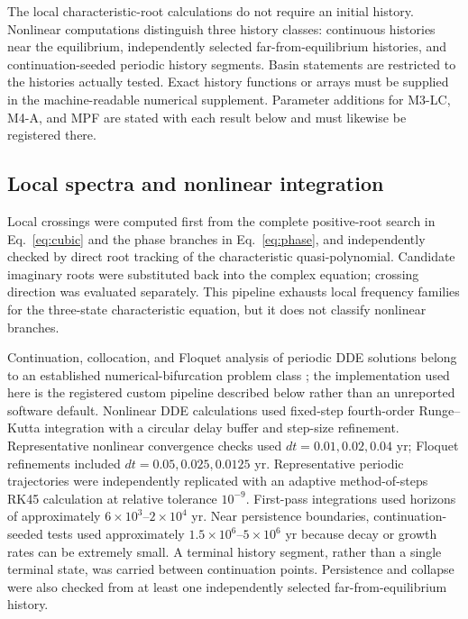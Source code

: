 \documentclass[11pt]{article}
\begin{document}
The local characteristic-root calculations do not require an initial history. Nonlinear computations distinguish three history classes: continuous histories near the equilibrium, independently selected far-from-equilibrium histories, and continuation-seeded periodic history segments. Basin statements are restricted to the histories actually tested. Exact history functions or arrays must be supplied in the machine-readable numerical supplement. Parameter additions for M3-LC, M4-A, and MPF are stated with each result below and must likewise be registered there.

\subsection{Local spectra and nonlinear integration}

Local crossings were computed first from the complete positive-root search in Eq.~\eqref{eq:cubic} and the phase branches in Eq.~\eqref{eq:phase}, and independently checked by direct root tracking of the characteristic quasi-polynomial. Candidate imaginary roots were substituted back into the complex equation; crossing direction was evaluated separately. This pipeline exhausts local frequency families for the three-state characteristic equation, but it does not classify nonlinear branches.

Continuation, collocation, and Floquet analysis of periodic DDE solutions belong to an established numerical-bifurcation problem class \cite{engelborghs2002}; the implementation used here is the registered custom pipeline described below rather than an unreported software default. Nonlinear DDE calculations used fixed-step fourth-order Runge--Kutta integration with a circular delay buffer and step-size refinement. Representative nonlinear convergence checks used $dt=0.01,0.02,0.04$ yr; Floquet refinements included $dt=0.05,0.025,0.0125$ yr. Representative periodic trajectories were independently replicated with an adaptive method-of-steps RK45 calculation at relative tolerance $10^{-9}$. First-pass integrations used horizons of approximately $6\times10^3$--$2\times10^4$ yr. Near persistence boundaries, continuation-seeded tests used approximately $1.5\times10^6$--$5\times10^6$ yr because decay or growth rates can be extremely small. A terminal history segment, rather than a single terminal state, was carried between continuation points. Persistence and collapse were also checked from at least one independently selected far-from-equilibrium history.
\end{document}
